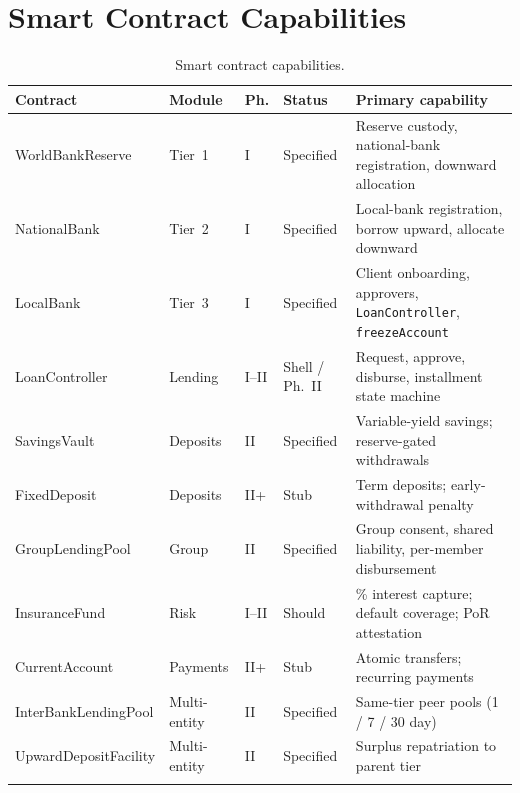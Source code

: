 \documentclass[12pt,a4paper]{report}
\newcommand{\tableheadcolor}{\rowcolor{TableHeadBg}}
\begin{document}
\section{Smart Contract Capabilities}
\label{app:smart-contract-capabilities}

\begin{table}[H]
\centering
\caption[Smart contract capabilities]{Smart contract capabilities.}
\label{tab:appendix-contract-capabilities}
\footnotesize
\setlength{\tabcolsep}{3.5pt}
\renewcommand{\arraystretch}{1.08}
\begin{tabular}{@{}>{\raggedright\arraybackslash}p{2.4cm}>{\raggedright\arraybackslash}p{1.6cm}>{\centering\arraybackslash}p{0.9cm}>{\raggedright\arraybackslash}p{1.5cm}>{\raggedright\arraybackslash}p{6.2cm}@{}}
\toprule
\tableheadcolor
\textbf{Contract} & \textbf{Module} & \textbf{Ph.} & \textbf{Status} & \textbf{Primary capability} \\
\midrule
WorldBankReserve & Tier~1 & I & Specified & Reserve custody, national-bank registration, downward allocation \\
\rowcolor{RowShade}
NationalBank & Tier~2 & I & Specified & Local-bank registration, borrow upward, allocate downward \\
LocalBank & Tier~3 & I & Specified & Client onboarding, approvers, \texttt{LoanController}, \texttt{freezeAccount} \\
\rowcolor{RowShade}
LoanController & Lending & I--II & Shell / Ph.~II & Request, approve, disburse, installment state machine \\
SavingsVault & Deposits & II & Specified & Variable-yield savings; reserve-gated withdrawals \\
\rowcolor{RowShade}
FixedDeposit & Deposits & II+ & Stub & Term deposits; early-withdrawal penalty \\
GroupLendingPool & Group & II & Specified & Group consent, shared liability, per-member disbursement \\
\rowcolor{RowShade}
InsuranceFund & Risk & I--II & Should & 5\% interest capture; default coverage; PoR attestation \\
CurrentAccount & Payments & II+ & Stub & Atomic transfers; recurring payments \\
\rowcolor{RowShade}
InterBankLendingPool & Multi-entity & II & Specified & Same-tier peer pools (1 / 7 / 30 day) \\
UpwardDepositFacility & Multi-entity & II & Specified & Surplus repatriation to parent tier \\
\rowcolor{RowShade}

\end{tabular}
\end{table}
\end{document}
